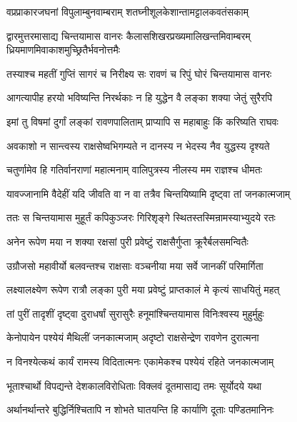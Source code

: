 \twolineshloka
{वप्रप्राकारजघनां विपुलाम्बुनवाम्बराम्}
{शतघ्नीशूलकेशान्तामट्टालकवतंसकाम्} %

\threelineshloka
{द्वारमुत्तरमासाद्य चिन्तयामास वानरः}
{कैलासशिखरप्रख्यमालिखन्तमिवाम्बरम्}
{ध्रियमाणमिवाकाशमुच्छ्रितैर्भवनोत्तमैः} %

\twolineshloka
{तस्याश्च महतीं गुप्तिं सागरं च निरीक्ष्य सः}
{रावणं च रिपुं घोरं चिन्तयामास वानरः} %

\twolineshloka
{आगत्यापीह हरयो भविष्यन्ति निरर्थकाः}
{न हि युद्धेन वै लङ्का शक्या जेतुं सुरैरपि} %

\twolineshloka
{इमां तु विषमां दुर्गां लङ्कां रावणपालिताम्}
{प्राप्यापि स महाबाहुः किं करिष्यति राघवः} %

\twolineshloka
{अवकाशो न सान्त्वस्य राक्षसेष्वभिगम्यते}
{न दानस्य न भेदस्य नैव युद्धस्य दृश्यते} %

\twolineshloka
{चतुर्णामेव हि गतिर्वानराणां महात्मनाम्}
{वालिपुत्रस्य नीलस्य मम राज्ञश्च धीमतः} %

\twolineshloka
{यावज्जानामि वैदेहीं यदि जीवति वा न वा}
{तत्रैव चिन्तयिष्यामि दृष्ट्वा तां जनकात्मजाम्} %

\twolineshloka
{ततः स चिन्तयामास मुहूर्तं कपिकुञ्जरः}
{गिरिशृङ्गे स्थितस्तस्मिन्रामस्याभ्युदये रतः} %

\twolineshloka
{अनेन रूपेण मया न शक्या रक्षसां पुरी}
{प्रवेष्टुं राक्षसैर्गुप्ता क्रूरैर्बलसमन्वितैः} %

\twolineshloka
{उग्रौजसो महावीर्यो बलवन्तश्च राक्षसाः}
{वञ्चनीया मया सर्वे जानकीं परिमार्गिता} %

\twolineshloka
{लक्ष्यालक्ष्येण रूपेण रात्रौ लङ्का पुरी मया}
{प्रवेष्टुं प्राप्तकालं मे कृत्यं साधयितुं महत्} %

\twolineshloka
{तां पुरीं तादृशीं दृष्ट्वा दुराधर्षां सुरासुरैः}
{हनूमांश्चिन्तयामास विनिःश्वस्य मुहुर्मुहुः} %

\twolineshloka
{केनोपायेन पश्येयं मैथिलीं जनकात्मजाम्}
{अदृष्टो राक्षसेन्द्रेण रावणेन दुरात्मना} %

\twolineshloka
{न विनश्येत्कथं कार्यं रामस्य विदितात्मनः}
{एकामेकश्च पश्येयं रहिते जनकात्मजाम्} %

\twolineshloka
{भूताश्चार्थो विपद्यन्ते देशकालविरोधिताः}
{विक्लवं दूतमासाद्य तमः सूर्योदये यथा} %

\twolineshloka
{अर्थानर्थान्तरे बुद्धिर्निश्चितापि न शोभते}
{घातयन्ति हि कार्याणि दूताः पण्डितमानिनः} %

